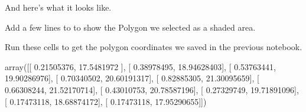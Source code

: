 \documentclass[letterpaper,10pt,english]{sphinxmanual}
\begin{document}
And here’s what it looks like.

\begin{sphinxVerbatim}[commandchars=\\\{\}]
\end{sphinxVerbatim}

\noindent{}

 Add a few lines to  to show the Polygon we selected as a shaded area.

Run these cells to get the polygon coordinates we saved in the previous notebook.

\begin{sphinxVerbatim}[commandchars=\\\{\}]
 

  
  

  
\end{sphinxVerbatim}

\begin{sphinxVerbatim}[commandchars=\\\{\}]
   
  
\end{sphinxVerbatim}

\begin{sphinxVerbatim}[commandchars=\\\{\}]
array([[ 0.21505376, 17.5481972 ],
       [ 0.38978495, 18.94628403],
       [ 0.53763441, 19.90286976],
       [ 0.70340502, 20.60191317],
       [ 0.82885305, 21.30095659],
       [ 0.66308244, 21.52170714],
       [ 0.43010753, 20.78587196],
       [ 0.27329749, 19.71891096],
       [ 0.17473118, 18.68874172],
       [ 0.17473118, 17.95290655]])
\end{sphinxVerbatim}
\end{document}
